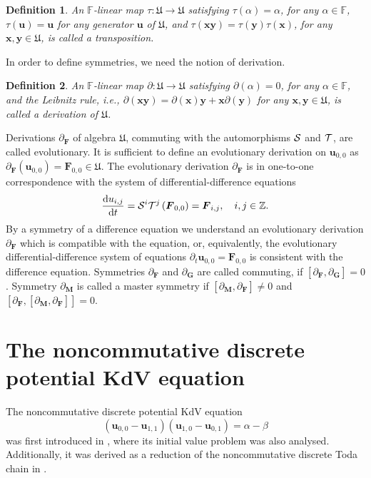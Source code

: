 \documentclass[dvips,10pt]{article}
\newcommand{\bs}{\boldsymbol}
\newcommand{\bsu}{ {\bs{u}}}
\newcommand{\bsx}{ {\bs{x}}}
\newcommand{\bsy}{ {\bs{y}}}
\newcommand{\bsF}{ {\bs{F}}}
\newcommand{\bsG}{ {\bs{G}}}
\newcommand{\bsM}{ {\bs{M}}}
\newtheorem{definition}{Definition}
\theoremstyle{remark} %
\begin{document}
	\begin{definition}
		An $\mathbb{F}$-linear map $\tau : {\mathfrak{U}} \rightarrow {\mathfrak{U}}$ satisfying $\tau(\alpha) = \alpha$, for any $\alpha \in {\mathbb{F}}$, $\tau(\bsu) = \bsu$ for any generator $\bsu$ of ${\mathfrak{U}}$, and $\tau(\bsx \bsy) = \tau(\bsy) \tau(\bsx)$, for any $\bsx, \bsy \in {\mathfrak{U}}$, is called a transposition.
	\end{definition}
	
	In order to define symmetries, we need the notion of derivation.
	
	\begin{definition}
		An $\mathbb{F}$-linear map $\partial : {\mathfrak{U}} \rightarrow {\mathfrak{U}}$ satisfying $\partial(\alpha) = 0$, for any $\alpha \in {\mathbb{F}}$, and the Leibnitz rule, i.e., $\partial(\bsx \bsy) = \partial(\bsx) \bsy +  \bsx \partial(\bsy)$ for any $\bsx, \bsy \in {\mathfrak{U}}$, is called a derivation of ${\mathfrak{U}}$.
	\end{definition}
	
	
	Derivations $\partial_\bsF$ of algebra ${\mathfrak{U}} $, commuting with the automorphisms ${\cal{S}}$ and ${\cal{T}}$, are called evolutionary. It is sufficient to define an evolutionary derivation on $\bsu_{0,0}$ as $\partial_\bsF(\bsu_{0,0}) = \bsF_{0,0} \in {\mathfrak{U}}$. The evolutionary derivation $\partial_\bsF$ is in one-to-one correspondence with the system of differential-difference equations 
	$$ \frac{{\rm{d}} u_{i,j}}{{\rm{d}} t} = {\cal{S}}^i {\cal{T}}^j \left(\bsF_{0,0}\right) = \bsF_{i,j}, ~~~ i,j \in \mathbb{Z}.$$ 
	By a symmetry of a difference equation we understand an evolutionary derivation $\partial_\bsF$ which is compatible with the equation, or, equivalently, the evolutionary differential-difference system of equations $\partial_{t} \bsu_{0,0} = \bsF_{0,0}$ is consistent with the difference equation. Symmetries $\partial_\bsF$ and $\partial_\bsG$ are called commuting, if $[\partial_\bsF,\partial_\bsG] = 0$. Symmetry $\partial_\bsM$ is called a master symmetry if $[\partial_\bsM,\partial_\bsF] \ne 0$ and $[\partial_\bsF,[\partial_\bsM,\partial_\bsF]]= 0$.
	
	
	
	\section{The noncommutative discrete potential KdV equation} \label{sec:pKdV}
	
	The noncommutative discrete potential KdV equation
	\begin{equation} \label{eq:nonAbel-pKdV}
		\left({\bs{u}}_{0,0} - {\bs{u}}_{1,1}\right) \left( {\bs{u}}_{1,0}-{\bs{u}}_{0,1}\right) = \alpha - \beta
	\end{equation}
	was first introduced in \cite{FNC}, where its initial value problem was also analysed. Additionally, it was derived  as a reduction of the noncommutative discrete Toda chain in \cite{Betal}.
	
\end{document}
